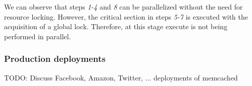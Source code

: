 We can observe that steps \textit{1-4} and \textit{8} can be parallelized without the need for resource locking. However, the critical section in steps \textit{5-7} is executed with the acquisition of a global lock. Therefore, at this stage execute is not being performed in parallel.


\subsubsection{Production deployments}
TODO: Discuss Facebook, Amazon, Twitter, ... deployments of memcached



